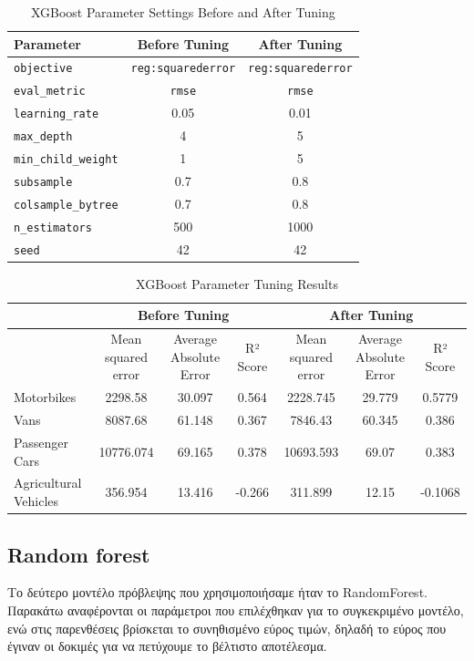 \documentclass{llncs}
\begin{document}
\begin{table}[h!]
    \centering
    \begin{tabular}{l|cc}
        \hline
        Parameter & Before Tuning & After Tuning \\
        \hline
        \texttt{objective} & \texttt{reg:squarederror} & \texttt{reg:squarederror} \\
        \texttt{eval\_metric} & \texttt{rmse} & \texttt{rmse} \\
        \texttt{learning\_rate} & 0.05 & 0.01 \\
        \texttt{max\_depth} & 4 & 5 \\
        \texttt{min\_child\_weight} & 1 & 5 \\
        \texttt{subsample} & 0.7 & 0.8 \\
        \texttt{colsample\_bytree} & 0.7 & 0.8 \\
        \texttt{n\_estimators} & 500 & 1000 \\
        \texttt{seed} & 42 & 42 \\
        \hline
    \end{tabular}
    \caption{XGBoost Parameter Settings Before and After Tuning}
\end{table}

\begin{table}[h!]
    \centering
    \begin{tabular}{lccc|ccc}
        \hline
        & \multicolumn{3}{c}{Before Tuning} & \multicolumn{3}{c}{After Tuning} \\
        \hline
        & Mean squared error & Average Absolute Error & R² Score & Mean squared error & Average Absolute Error & R² Score \\
        \hline
        Motorbikes & 2298.58 & 30.097 & 0.564 & 2228.745 & 29.779 & 0.5779 \\
        Vans & 8087.68 & 61.148 & 0.367 & 7846.43 & 60.345 & 0.386 \\
        Passenger Cars & 10776.074 & 69.165 & 0.378 & 10693.593 & 69.07 & 0.383 \\
        Agricultural Vehicles & 356.954 & 13.416 & -0.266 & 311.899 & 12.15 & -0.1068 \\
        \hline
    \end{tabular}
    \caption{XGBoost Parameter Tuning Results}
\end{table}

\subsection{Random forest}
Το δεύτερο μοντέλο πρόβλεψης που χρησιμοποιήσαμε ήταν το RandomForest. Παρακάτω αναφέρονται οι παράμετροι που επιλέχθηκαν για το συγκεκριμένο μοντέλο, ενώ στις παρενθέσεις βρίσκεται το συνηθισμένο εύρος τιμών, δηλαδή το εύρος που έγιναν οι δοκιμές για να πετύχουμε το βέλτιστο αποτέλεσμα.\\
\end{document}
